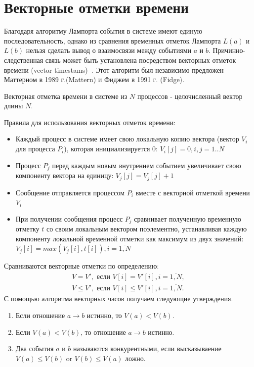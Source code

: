 \section{Векторные отметки времени} 
Благодаря алгоритму Лампорта события в системе имеют единую последовательность, однако из сравнения временных отметок Лампорта $L(a)$ и $L(b)$  нельзя сделать вывод о взаимосвязи между событиями $a$ и $b$. Причинно-следственная связь может быть установлена посредством векторных
отметок времени (vector timestams)~\cite{tanenbaum}. Этот алгоритм был независимо предложен Маттерном в 1989 г.(Mattern) и Фиджем в 1991 г. (Fidge).\par
Векторная отметка времени в системе из $N$ процессов - целочисленный вектор длины $N$.\par
Правила для использования векторных отметок времени:  
\begin{itemize}
\item Каждый процесс в системе имеет свою локальную копию вектора (вектор $V_i$ для процесса $P_i$), которая инициализируется $0$: $V_i[j] = 0, i,j = 1..N$ 
\item Процесс $P_j$ перед каждым новым внутреннем событием увеличивает свою компоненту вектора на единицу: $V_j[j] = V_j[j] + 1$
\item Сообщение отправляется процессом $P_i$ вместе с векторной отметкой времени $V_i$
\item При получении сообщения процесс $P_j$ сравнивает полученную временную отметку $t$ со своим локальным вектором поэлементно, устанавливая каждую компоненту локальной временной отметки как максимум из двух значений: $V_j[i] = max(V_j[i],t[i]), i = \overline{1,N}$
\end{itemize}
Сравниваются векторные отметки по определению: 
\begin{gather*}
  V = V', \text{ если } V[i] = V'[i], i = \overline{1,N}, \\
  V \leq V',  \text{ если } V[i] \leq V'[i], i = \overline{1,N} .
\end{gather*}
С помощью алгоритма векторных часов получаем следующие утверждения.
\begin{enumerate}
\item Если отношение $a \rightarrow b$ истинно, то $V(a) < V(b)$.
\item Если $V(a) < V(b)$, то отношение $a \rightarrow b$ истинно.
\item Два события $a$ и $b$ называются конкурентными, если высказываение $V(a)\leq V(b)$ or $V(b)\leq V(a)$ ложно.
\end{enumerate}

